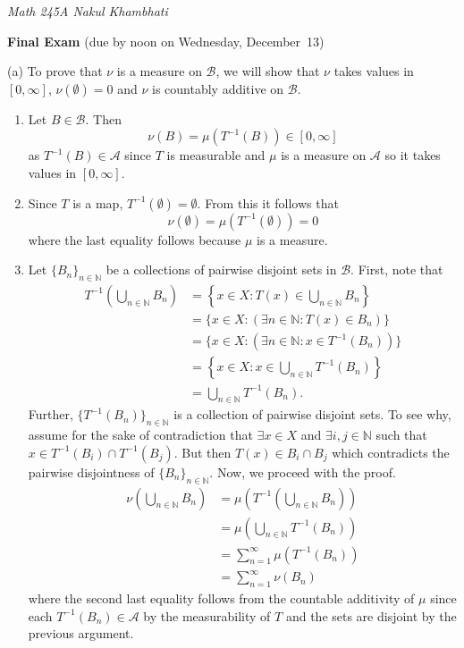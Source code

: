 \documentclass[12pt]{amsart} %
\def\N{\mathbb{N}}
\def\B{\mathcal{B}}
\def\A{\mathcal{A}}
\begin{document}
\thispagestyle{empty}
\pagestyle{empty}
\noindent 
\textsl{Math 245A  \hfill Nakul Khambhati}

\bigskip\bigskip
\centerline {\textbf{Final Exam} (due by noon on Wednesday, December~13) }

 
\smallskip \noindent
(a) To prove that $\nu$ is a measure on $\B$, we will show that $\nu$ takes values in $[0,\infty]$, $\nu\left( \emptyset \right) = 0$ and $\nu$ is countably additive on $\B$.

\begin{enumerate}
	\item Let $B \in \B$. Then 
		$$\nu(B) = \mu\left( T^{-1}(B) \right) \in [0,\infty]$$ 
		as $T^{-1}(B) \in \A$ since $T$ is measurable and $\mu$ is a measure on $\A$ so it takes values in $[0,\infty].$
	\item Since $T$ is a map, $T^{-1}\left( \emptyset \right) = \emptyset.$ From this it follows that $$\nu\left( \emptyset \right) = \mu\left( T^{-1} (\emptyset) \right)= 0$$ where the last equality follows because $\mu$ is a measure.
	\item Let $\{B_n\}_{n \in \N}$ be a collections of pairwise disjoint sets in $\B$. First, note that
	\begin{align*}
		T^{-1}\left( \bigcup_{n \in \N} B_n \right)
		&= \left\{x \in X: T(x) \in \bigcup_{n \in \N} B_n\right\} \\
		&= \{x \in X: ( \exists n \in \N : T(x) \in B_n )\} \\
		&= \{x \in X: ( \exists n \in \N : x \in T^{-1}(B_n) )\} \\
		&= \left\{x \in X:  x \in \bigcup_{n \in \N} T^{-1}(B_n) \right\} \\
		&= \bigcup_{n \in \N} T^{-1}(B_n).
	\end{align*}
	Further, $\{T^{-1}(B_n)\}_{n \in \N}$ is a collection of pairwise disjoint sets. To see why, assume for the sake of contradiction that $\exists x \in X$ and $\exists i,j \in \N$ such that $x \in T^{-1}(B_i) \cap T^{-1}(B_j).$ But then $T(x) \in B_i \cap B_j$ which contradicts the pairwise disjointness of $\{B_n\}_{n \in \N}.$ Now, we proceed with the proof.  
	\begin{align*}
		\nu\left(\bigcup_{n \in \N} B_n\right) 
		&= \mu\left( T^{-1}\left( \bigcup_{n \in \N} B_n \right) \right) \\
		&= \mu\left( \bigcup_{n \in \N} T^{-1} (B_n) \right) \\
		&= \sum_{n=1}^{\infty} \mu\left( T^{-1}(B_n) \right)  \\
		&= \sum_{n = 1}^{\infty} \nu(B_n)
	\end{align*}
	where the second last equality follows from the countable additivity of $\mu$ since each  $T^{-1}(B_n) \in \A$ by the measurability of $T$ and the sets are disjoint by the previous argument. 
		
\end{enumerate}
\end{document}
